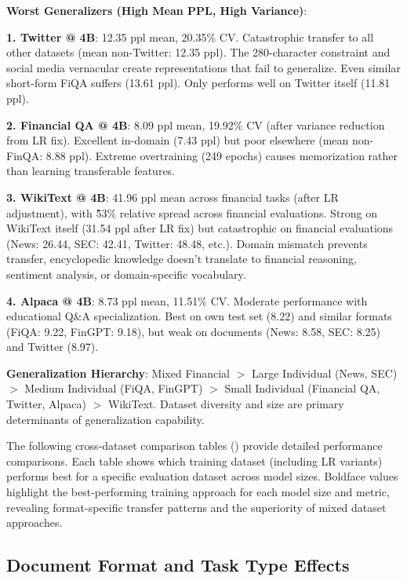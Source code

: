 \textbf{Worst Generalizers (High Mean PPL, High Variance)}:

\textbf{1. Twitter @ 4B}: 12.35 ppl mean, 20.35\% CV. Catastrophic transfer to all other datasets (mean non-Twitter: 12.35 ppl). The 280-character constraint and social media vernacular create representations that fail to generalize. Even similar short-form FiQA suffers (13.61 ppl). Only performs well on Twitter itself (11.81 ppl).

\textbf{2. Financial QA @ 4B}: 8.09 ppl mean, 19.92\% CV (after variance reduction from LR fix). Excellent in-domain (7.43 ppl) but poor elsewhere (mean non-FinQA: 8.88 ppl). Extreme overtraining (249 epochs) causes memorization rather than learning transferable features.

\textbf{3. WikiText @ 4B}: 41.96 ppl mean across financial tasks (after LR adjustment), with \~53\% relative spread across financial evaluations. Strong on WikiText itself (31.54 ppl after LR fix) but catastrophic on financial evaluations (News: 26.44, SEC: 42.41, Twitter: 48.48, etc.). Domain mismatch prevents transfer, encyclopedic knowledge doesn't translate to financial reasoning, sentiment analysis, or domain-specific vocabulary.

\textbf{4. Alpaca @ 4B}: 8.73 ppl mean, 11.51\% CV. Moderate performance with educational Q\&A specialization. Best on own test set (8.22) and similar formats (FiQA: 9.22, FinGPT: 9.18), but weak on documents (News: 8.58, SEC: 8.25) and Twitter (8.97).

\textbf{Generalization Hierarchy}: Mixed Financial $>$ Large Individual (News, SEC) $>$ Medium Individual (FiQA, FinGPT) $>$ Small Individual (Financial QA, Twitter, Alpaca) $>$ WikiText. Dataset diversity and size are primary determinants of generalization capability.

The following cross-dataset comparison tables () provide detailed performance comparisons. Each table shows which training dataset (including LR variants) performs best for a specific evaluation dataset across model sizes. Boldface values highlight the best-performing training approach for each model size and metric, revealing format-specific transfer patterns and the superiority of mixed dataset approaches.

\subsection{Document Format and Task Type Effects}

